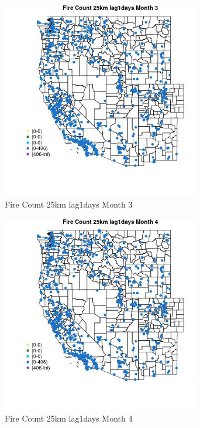 \begin{figure} 
\centering  
\includegraphics[width=0.77\textwidth]{Code_Outputs/Report_ML_input_PM25_Step4_part_f_de_duplicated_aveswNAs_MapObsMo3Fire_Count_25km_lag1days.jpg} 
\caption{\label{fig:Report_ML_input_PM25_Step4_part_f_de_duplicated_aveswNAsMapObsMo3Fire_Count_25km_lag1days}Fire Count 25km lag1days Month 3} 
\end{figure} 
 

\begin{figure} 
\centering  
\includegraphics[width=0.77\textwidth]{Code_Outputs/Report_ML_input_PM25_Step4_part_f_de_duplicated_aveswNAs_MapObsMo4Fire_Count_25km_lag1days.jpg} 
\caption{\label{fig:Report_ML_input_PM25_Step4_part_f_de_duplicated_aveswNAsMapObsMo4Fire_Count_25km_lag1days}Fire Count 25km lag1days Month 4} 
\end{figure} 
 

